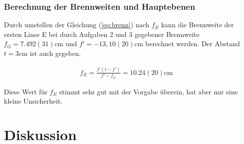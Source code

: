 \documentclass[11pt, a4paper]{article}
\begin{document}
    \subsubsection{Berechnung der Brennweiten und Hauptebenen}
    Durch umstellen der Gleichung (\ref{eq:brenn}) nach $f_E$ kann die Brennweite der ersten Linse E bei durch Aufgaben 2 und 3 gegebener Brennweite $f_G = 7.492(31) \si{\centi\metre}$ und $f' = - 13,10(20) \si{\centi\metre}$ berechnet werden. Der Abstand $t = 3 \si{\centi\metre}$ ist auch gegeben.

    \begin{align}
        f_E = \frac{f' \left(t - f'\right)}{f' - f_G} = 10.24(20) \si{\centi\metre}
    \end{align}

    Diese Wert für $f_E$ stimmt sehr gut mit der Vorgabe überein, hat aber nur eine kleine Unsicherheit.






    \section{Diskussion}

    
    
\end{document}
